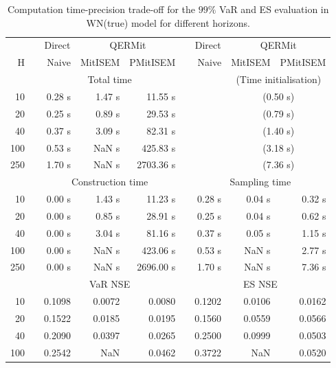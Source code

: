 \footnotesize{  
{ \renewcommand{\arraystretch}{1.3} 
\begin{longtable}{rr rrr r rrr}  
\caption{Computation time-precision trade-off for the  $99\%$ VaR and ES evaluation in WN(true) model for different horizons.} 
\label{tab:time_precision_WN_ML} \\ 
 & & \multicolumn{1}{c}{Direct} & \multicolumn{2}{c}{QERMit}&  & \multicolumn{1}{c}{Direct} & \multicolumn{2}{c}{QERMit} \\ \cline{3-5} \cline{7-9} 
 H & & Naive & MitISEM & PMitISEM & & Naive & MitISEM & PMitISEM \\ \hline 
 & & \multicolumn{3}{c}{Total time} & & & \multicolumn{2}{c}{(Time initialisation)}  \\ \cline{3-5} \cline{8-9}
10 & & 0.28 s & 1.47 s & 11.55 s &&& \multicolumn{2}{c}{(0.50 s)} \\ 
20 & & 0.25 s & 0.89 s & 29.53 s &&& \multicolumn{2}{c}{(0.79 s)} \\ 
40 & & 0.37 s & 3.09 s & 82.31 s &&& \multicolumn{2}{c}{(1.40 s)} \\ 
100 & & 0.53 s &  NaN s & 425.83 s &&& \multicolumn{2}{c}{(3.18 s)} \\ 
250 & & 1.70 s &  NaN s & 2703.36 s &&& \multicolumn{2}{c}{(7.36 s)} \\ 
\hline 
 & & \multicolumn{3}{c}{Construction time} & & \multicolumn{3}{c}{ Sampling time} \\ \cline{3-5}  \cline{7-9}
10 & & 0.00 s & 1.43 s & 11.23 s &&  0.28 s & 0.04 s & 0.32 s \\ 
20 & & 0.00 s & 0.85 s & 28.91 s &&  0.25 s & 0.04 s & 0.62 s \\ 
40 & & 0.00 s & 3.04 s & 81.16 s &&  0.37 s & 0.05 s & 1.15 s \\ 
100 & & 0.00 s &  NaN s & 423.06 s &&  0.53 s &  NaN s & 2.77 s \\ 
250 & & 0.00 s &  NaN s & 2696.00 s &&  1.70 s &  NaN s & 7.36 s \\ 
\hline 
 & & \multicolumn{3}{c}{VaR NSE} &&  \multicolumn{3}{c}{ES NSE} \\ \cline{3-5}  \cline{7-9}
10 && 0.1098  & 0.0072  & 0.0080 && 0.1202  & 0.0106  & 0.0162  \\ 
20 && 0.1522  & 0.0185  & 0.0195 && 0.1560  & 0.0559  & 0.0566  \\ 
40 && 0.2090  & 0.0397  & 0.0265 && 0.2500  & 0.0999  & 0.0503  \\ 
100 && 0.2542  &    NaN  & 0.0462 && 0.3722  &    NaN  & 0.0520  \\ 

\end{longtable}}}
